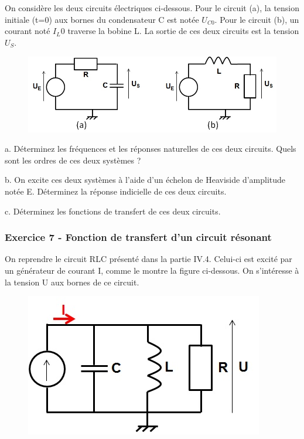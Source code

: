 	On considère les deux circuits électriques ci-dessous. Pour le circuit (a), la tension initiale (t=0) aux bornes du condensateur C est notée $U_{C0}$. Pour le circuit (b), un courant noté $I_L0$ traverse la bobine L. La sortie de ces deux circuits est la tension $U_{S}$.
	
	\begin{figure}[h!]
		\centering
		\includegraphics[scale=0.5]{images/Exo_2_4.jpg} 
	\end{figure} 
	
	a. Déterminez les fréquences et les réponses naturelles de ces deux circuits. Quels sont les ordres de ces deux systèmes ? 
	
	b. On excite ces deux systèmes à l'aide d'un échelon de Heaviside d'amplitude notée E. Déterminez la réponse indicielle de ces deux circuits. 
	
	c. Déterminez les fonctions de transfert de ces deux circuits.
	
	\vspace{1\baselineskip}
	
	\subsubsection{Exercice 7 - Fonction de transfert d'un circuit résonant}
	
	On reprendre le circuit RLC présenté dans la partie IV.4. Celui-ci est excité par un générateur de courant I, comme le montre la figure ci-dessous. On s'intéresse à la tension U aux bornes de ce circuit. 
	
	\begin{figure}[h!]
		\centering
		\includegraphics[scale=0.5]{images/Exo_2_5.jpg} 
	\end{figure} 
	
